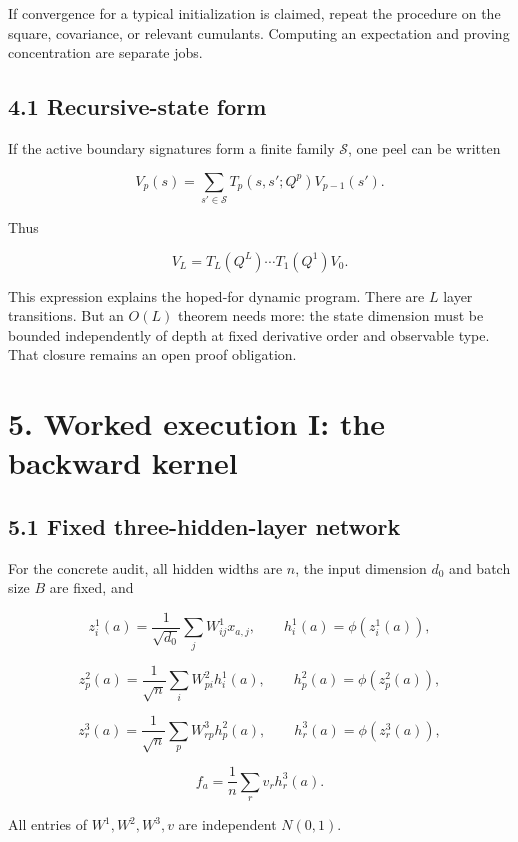 If convergence for a typical initialization is claimed, repeat the procedure
on the square, covariance, or relevant cumulants. Computing an expectation and
proving concentration are separate jobs.

\subsection*{4.1 Recursive-state form}


If the active boundary signatures form a finite family \(\mathcal S\), one
peel can be written

\[
V_p(s)
=
\sum_{s'\in\mathcal S}
T_p(s,s';Q^p)V_{p-1}(s').
\]


Thus

\[
V_L
=
T_L(Q^L)\cdots T_1(Q^1)V_0.
\]


This expression explains the hoped-for dynamic program. There are \(L\)
layer transitions. But an \(O(L)\) theorem needs more: the state dimension
must be bounded independently of depth at fixed derivative order and
observable type. That closure remains an open proof obligation.

\section*{5. Worked execution I: the backward kernel}


\subsection*{5.1 Fixed three-hidden-layer network}


For the concrete audit, all hidden widths are \(n\), the input dimension
\(d_0\) and batch size \(B\) are fixed, and

\[
z_i^1(a)=\frac1{\sqrt{d_0}}\sum_jW^1_{ij}x_{a,j},
\qquad
h_i^1(a)=\phi(z_i^1(a)),
\]


\[
z_p^2(a)=\frac1{\sqrt n}\sum_iW^2_{pi}h_i^1(a),
\qquad
h_p^2(a)=\phi(z_p^2(a)),
\]


\[
z_r^3(a)=\frac1{\sqrt n}\sum_pW^3_{rp}h_p^2(a),
\qquad
h_r^3(a)=\phi(z_r^3(a)),
\]


\[
f_a=\frac1n\sum_rv_rh_r^3(a).
\]


All entries of \(W^1,W^2,W^3,v\) are independent \(N(0,1)\).

